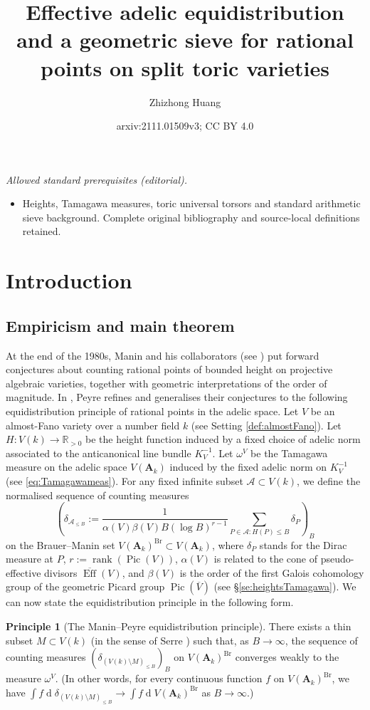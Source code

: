 \documentclass[11pt,letterpaper]{amsart}
\title{Effective adelic equidistribution and a geometric sieve for rational points on split toric varieties}
\author{Zhizhong Huang}
\date{arxiv:2111.01509v3; CC BY 4.0}
\newcommand{\BR}{{\mathbb {R}}}
\newcommand{\CA}{{\mathcal {A}}}
\newcommand{\RA}{{\mathbf {A}}}
\newcommand{\Pic}{\operatorname{Pic}}
\theoremstyle{plain}
\numberwithin{equation}{section}
\theoremstyle{definition}
\newtheorem{principle}[theorem]{Principle}
\theoremstyle{remark}
\begin{document}
\maketitle
\noindent\textit{Allowed standard prerequisites (editorial).}\begin{itemize}
\item Heights, Tamagawa measures, toric universal torsors and standard arithmetic sieve background. Complete original bibliography and source-local definitions retained.
\end{itemize}\medskip
\section{Introduction}
\subsection{Empiricism and main theorem}
At the end of the 1980s, Manin and his collaborators (see \cite{Bat-Manin,F-M-T}) put forward conjectures about counting rational points of bounded height on projective algebraic varieties, together with geometric interpretations of the order of magnitude.  In \cite{Peyre,PeyreLille}, Peyre refines and generalises their conjectures to the following equidistribution principle of rational points in the adelic space. 
Let $V$ be an almost-Fano variety over a number field $k$ (see Setting \ref{def:almostFano}). Let $H:V(k)\to\BR_{>0}$ be the height function induced by a fixed choice of adelic norm associated to the anticanonical line bundle $K_V^{-1}$. 
Let $\omega^V$ be the Tamagawa measure on the adelic space $V(\RA_k)$ induced by the fixed adelic norm on $K_V^{-1}$ (see \eqref{eq:Tamagawameas}). For any fixed infinite subset $\CA\subset V(k)$, we define the normalised sequence of counting measures	\begin{equation}\label{eq:seqVAk}
	\left(\delta_{\CA_{\leqslant B}}:=\frac{1}{\alpha(V)\beta(V)B (\log B)^{r-1}}\sum_{P\in \CA:H(P)\leqslant B} \delta_P\right)_B
\end{equation} on the Brauer--Manin set $V(\RA_k)^{\operatorname{Br}}\subset V(\RA_k)$, where $\delta_P$ stands for the Dirac measure at $P$, $r:=\operatorname{rank}(\Pic(V))$, $\alpha(V)$ is related to the cone of pseudo-effective divisors $\overline{\operatorname{Eff}}(V)$, and $\beta(V)$ is the order of the first Galois cohomology group of the geometric Picard group $\Pic(\overline{V})$ (see \S\ref{se:heightsTamagawa}). We can now state  the equidistribution principle in the following form.
\begin{principle}[The Manin--Peyre equidistribution principle]\label{prin:Manin-Peyre}
	There exists a thin subset $M\subset V(k)$ (in the sense of Serre \cite[Definition 3.1.1]{Serre}) such that, as $B\to \infty$, the sequence of counting measures $(\delta_{(V(k)\setminus M)_{\leqslant B}})_B$ on $V(\RA_k)^{\operatorname{Br}}$
	converges weakly to the measure $\omega^V$. (In other words, for every continuous function $f$ on $V(\RA_k)^{\operatorname{Br}}$, we have $\int f \operatorname{d}\delta_{(V(k)\setminus M)_{\leqslant B}}\to \int f \operatorname{d}V(\RA_k)^{\operatorname{Br}}$ as $B\to \infty$.)
\end{principle} 
\end{document}
